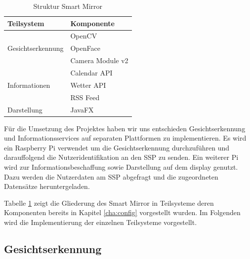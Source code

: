 \begin{table}[]
\centering
\caption{Struktur Smart Mirror}
\label{my-label}
\begin{tabular}{@{}|l|l|@{}}
\toprule
Teilsystem                         & Komponente       \\ \midrule
\multirow{3}{*}{Gesichtserkennung} & OpenCV           \\ \cmidrule(l){2-2} 
                                   & OpenFace         \\ \cmidrule(l){2-2} 
                                   & Camera Module v2 \\ \midrule
\multirow{3}{*}{Informationen}     & Calendar API     \\ \cmidrule(l){2-2} 
                                   & Wetter API       \\ \cmidrule(l){2-2} 
                                   & RSS Feed         \\ \midrule
Darstellung                        & JavaFX           \\ \bottomrule
\end{tabular}
\label{tab:smirror}
\end{table}

Für die Umsetzung des Projektes haben wir uns entschieden Gesichtserkennung und Informationsservices auf separaten Plattformen zu implementieren. Es wird ein Raspberry Pi verwendet um die Gesichtserkennung durchzuführen und darauffolgend die Nutzeridentifikation an den SSP zu senden. Ein weiterer Pi wird zur Informationsbeschaffung sowie Darstellung auf dem display genutzt. Dazu werden die Nutzerdaten am SSP abgefragt und die zugeordneten Datensätze heruntergeladen. 

Tabelle \ref{tab:smirror} zeigt die Gliederung des Smart Mirror in Teilsysteme deren Komponenten bereits in Kapitel \ref{cha:config} vorgestellt wurden. Im Folgenden wird die Implementierung der einzelnen Teilsysteme vorgestellt.


\subsection{Gesichtserkennung}
\label{subsec:facedetection}

